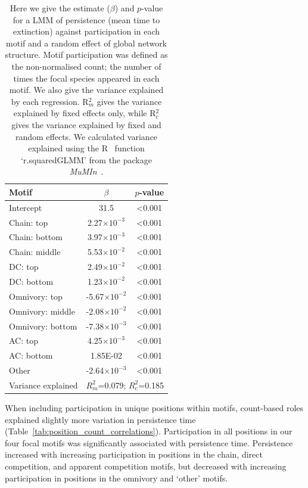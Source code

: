 \documentclass[12pt]{article}
\begin{document}
\begin{spacing}{2.0}
		\begin{table}[hb!]
    		\caption{Here we give the estimate ($\beta$) and $p$-value for a LMM of persistence (mean time to extinction) against participation in each motif and a random effect of global network structure. Motif participation was defined as the non-normalised count; the number of times the focal species appeared in each motif. We also give the variance explained by each regression. R$^{2}_{m}$ gives the variance explained by fixed effects only, while R$^{2}_{c}$ gives the variance explained by fixed and random effects. We calculated variance explained using the R~\citep{R} function `r.squaredGLMM' from the package \emph{MuMIn}~\citep{MuMIn}.}
    		\label{tab:count_positions}
    		\begin{tabular}{l | c c}
    		Motif & $\beta$ & $p$-value \\  
    		\hline
            Intercept	&	31.5	&	\textless0.001	\\
            Chain: top	&	2.27$\times10^{-3}$	&	\textless0.001	\\
            Chain: bottom	&	3.97$\times10^{-3}$	&	\textless0.001	\\
            Chain: middle	&	5.53$\times10^{-2}$	&	\textless0.001	\\
            DC: top	&	2.49$\times10^{-2}$	&	\textless0.001	\\
            DC: bottom	&	1.23$\times10^{-2}$	&	\textless0.001	\\
            Omnivory: top	&	-5.67$\times10^{-2}$	&	\textless0.001	\\
            Omnivory: middle	&	-2.08$\times10^{-2}$	&	\textless0.001	\\
            Omnivory: bottom	&	-7.38$\times10^{-3}$	&	\textless0.001	\\
            AC: top	&	4.25$\times10^{-3}$	&	\textless0.001	\\
            AC: bottom	&	1.85E-02	&	\textless0.001	\\
            Other	&	-2.64$\times10^{-3}$	&	\textless0.001	\\
            \hline
    		Variance explained & \multicolumn{2}{c}{$R^{2}_m$=0.079; $R^2_c$=0.185} \\
    		\hline
    		\end{tabular}
    		\end{table}

        
        When including participation in unique positions within motifs, count-based roles explained slightly more variation in persistence time (Table~\ref{tab:position_count_correlations}).
        Participation in all positions in our four focal motifs was significantly associated with persistence time.
        Persistence increased with increasing participation in positions in the chain, direct competition, and apparent competition motifs, but decreased with increasing participation in positions in the omnivory and `other' motifs.



\end{spacing}
\end{document}
